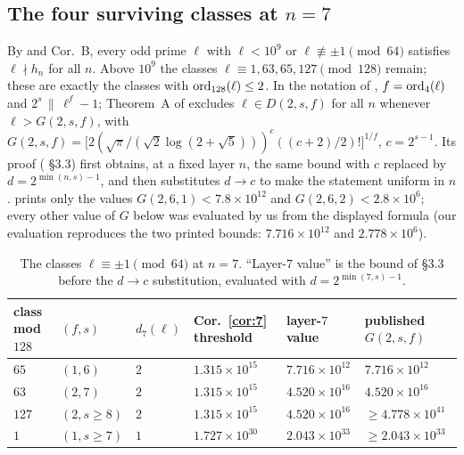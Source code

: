 \documentclass[11pt]{amsart}
\theoremstyle{remark}\newtheorem{remark}[theorem]{Remark}
\theoremstyle{definition}\newtheorem{definition}[theorem]{Definition}
\theoremstyle{definition}\newtheorem{algorithm}[theorem]{Algorithm}
\begin{document}
\subsection{The four surviving classes at $n=7$}\label{sec:classes}
By \cite{FK3} and \cite{MO16} Cor.~B, every odd prime $\ell$ with $\ell<10^9$ or $\ell\not\equiv\pm1\pmod{64}$ satisfies $\ell\nmid h_n$ for all $n$. Above $10^9$ the classes $\ell\equiv1,63,65,127\pmod{128}$ remain; these are exactly the classes with $\operatorname{ord}_{128}(\ell)\le2$. In the notation of \cite{MO16}, $f=\operatorname{ord}_4(\ell)$ and $2^s\,\|\,\ell^f-1$; Theorem~A of \cite{MO16} excludes $\ell\in D(2,s,f)$ for all $n$ whenever $\ell>G(2,s,f)$, with $G(2,s,f)=\big[2(\sqrt\pi/(\sqrt2\log(2+\sqrt5)))^{c}((c+2)/2)!\big]^{1/f}$, $c=2^{s-1}$. Its proof (\cite{MO16} \S3.3) first obtains, at a fixed layer $n$, the same bound with $c$ replaced by $d=2^{\min(n,s)-1}$, and then substitutes $d\to c$ to make the statement uniform in $n$. \cite{MO16} prints only the values $G(2,6,1)<7.8\times10^{12}$ and $G(2,6,2)<2.8\times10^6$; every other value of $G$ below was evaluated by us from the displayed formula (our evaluation reproduces the two printed bounds: $7.716\times10^{12}$ and $2.778\times10^6$).
\begin{table}[h]\footnotesize
\begin{tabular}{@{}p{1.5cm}p{1.4cm}p{0.9cm}p{2.2cm}p{2.2cm}p{2.4cm}@{}}\toprule
class mod $128$ & $(f,s)$ & $d_7(\ell)$ & Cor.~\ref{cor:7} threshold & \cite{MO16} layer-$7$ value & \cite{MO16} published $G(2,s,f)$\\ \midrule
$65$ & $(1,6)$ & $2$ & $1.315\times10^{15}$ & $7.716\times10^{12}$ & $7.716\times10^{12}$\\
$63$ & $(2,7)$ & $2$ & $1.315\times10^{15}$ & $4.520\times10^{16}$ & $4.520\times10^{16}$\\
$127$ & $(2,s\ge8)$ & $2$ & $1.315\times10^{15}$ & $4.520\times10^{16}$ & $\ge4.778\times10^{41}$\\
$1$ & $(1,s\ge7)$ & $1$ & $1.727\times10^{30}$ & $2.043\times10^{33}$ & $\ge2.043\times10^{33}$\\
\bottomrule\end{tabular}
\caption{The classes $\ell\equiv\pm1\pmod{64}$ at $n=7$. ``Layer-$7$ value'' is the bound of \cite{MO16} \S3.3 before the $d\to c$ substitution, evaluated with $d=2^{\min(7,s)-1}$.}\label{tab:classes}
\end{table}
\end{document}
